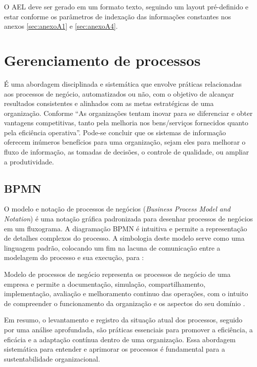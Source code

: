 O AEL deve ser gerado em um formato texto, seguindo um layout pré-definido e estar conforme os parâmetros de indexação das informações constantes nos anexos \ref{sec:anexoA1} e \ref{sec:anexoA4}.

\section{Gerenciamento de processos}
É uma abordagem disciplinada e sistemática que envolve práticas relacionadas aos processos de negócio, automatizados ou não, com o objetivo de alcançar resultados consistentes e alinhados com as metas estratégicas de uma organização. 
Conforme  ``As organizações tentam inovar para se diferenciar e obter vantagens competitivas, tanto pela melhoria nos bens/serviços fornecidos quanto pela eficiência operativa''.
 Pode-se concluir que os sistemas de informação oferecem inúmeros benefícios para uma organização, sejam eles para melhorar o fluxo de informação, as tomadas de decisões, o controle de qualidade, ou ampliar a produtividade.
\subsection{BPMN}
O modelo e notação de processos de negócios (\textit{Business Process Model and Notation}) é uma notação gráfica padronizada para desenhar processos de negócios em um fluxograma. A diagramação BPMN é intuitiva e permite a representação de detalhes complexos do processo. A simbologia deste modelo serve como uma linguagem padrão, colocando um fim na lacuna de comunicação entre a modelagem do processo e sua execução, para :
\begin{citacao}
	
	Modelo de processos de negócio representa os processos de negócio de uma empresa e permite a documentação, simulação, compartilhamento, implementação, avaliação e melhoramento continuo das operações, com o intuito de compreender o funcionamento da organização e os aspectos do seu domínio \cite{bitencourt2016elicitaccao}.
	
\end{citacao}
Em resumo, o levantamento e registro da situação atual dos processos, seguido por uma análise aprofundada, são práticas essenciais para promover a eficiência, a eficácia e a adaptação contínua dentro de uma organização. Essa abordagem sistemática para entender e aprimorar os processos é fundamental para a sustentabilidade organizacional.

